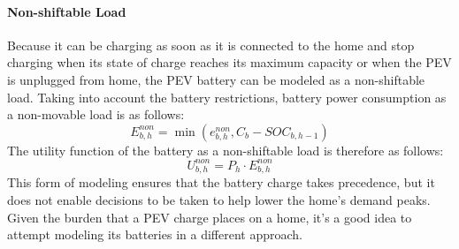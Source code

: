\paragraph{Non-shiftable Load}
Because it can be charging as soon as it is connected to the home and stop charging when its state of charge reaches its maximum capacity or when the PEV is unplugged from home, the PEV battery can be modeled as a non-shiftable load.
Taking into account the battery restrictions, battery power consumption as a non-movable load is as follows:
\begin{equation}
E^{non}_{b,h} = \min(e^{non}_{b,h}, C_b - SOC_{b,h-1})
\end{equation}
The utility function of the battery as a non-shiftable load is therefore as follows:
\begin{equation}
U^{non}_{b,h} = P_h \cdot E^{non}_{b,h}
\end{equation}
This form of modeling ensures that the battery charge takes precedence, but it does not enable decisions to be taken to help lower the home's demand peaks. Given the burden that a PEV charge places on a home, it's a good idea to attempt modeling its batteries in a different approach.

